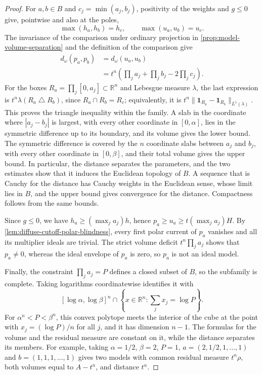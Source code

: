 \begin{proof}
For $a,b\in B$ and $c_j=\min(a_j,b_j)$, positivity of the weights and $g\leq0$ give, pointwise and also at the poles,
\[
 \max(h_a,h_b)=h_c,\qquad \max(u_a,u_b)=u_c.
\]
The invariance of the comparison under ordinary projection in \cref{prop:model-volume-separation} and the definition of the comparison give
\[
 \begin{split}
 d_\omega(p_a,p_b)&=d_\omega(u_a,u_b)\\
 &=t^n\left(\prod_j a_j+\prod_j b_j-2\prod_j c_j\right).
 \end{split}
\]
For the boxes $R_a=\prod_j[0,a_j]\subset\mathbb R^n$ and Lebesgue measure $\lambda$, the last expression is $t^n\lambda(R_a\mathbin{\triangle}R_b)$, since $R_a\cap R_b=R_c$; equivalently, it is $t^n\|\mathbf1_{R_a}-\mathbf1_{R_b}\|_{L^1(\lambda)}$. This proves the triangle inequality within the family. A slab in the coordinate where $|a_j-b_j|$ is largest, with every other coordinate in $[0,\alpha]$, lies in the symmetric difference up to its boundary, and its volume gives the lower bound. The symmetric difference is covered by the $n$ coordinate slabs between $a_j$ and $b_j$, with every other coordinate in $[0,\beta]$, and their total volume gives the upper bound. In particular, the distance separates the parameters, and the two estimates show that it induces the Euclidean topology of $B$. A sequence that is Cauchy for the distance has Cauchy weights in the Euclidean sense, whose limit lies in $B$, and the upper bound gives convergence for the distance. Compactness follows from the same bounds.

Since $g\leq0$, we have $h_a\geq(\max_ja_j)h$, hence $p_a\geq u_a\geq t(\max_ja_j)H$. By \cref{lem:diffuse-cutoff-polar-blindness}, every first polar current of $p_a$ vanishes and all its multiplier ideals are trivial. The strict volume deficit $t^n\prod_j a_j$ shows that $p_a\ne0$, whereas the ideal envelope of $p_a$ is zero, so $p_a$ is not an ideal model.

Finally, the constraint $\prod_ja_j=P$ defines a closed subset of $B$, so the subfamily is complete. Taking logarithms coordinatewise identifies it with
\[
 [\log\alpha,\log\beta]^n
       \cap\left\{x\in\mathbb R^n:\sum_jx_j=\log P\right\}.
\]
For $\alpha^n<P<\beta^n$, this convex polytope meets the interior of the cube at the point with $x_j=(\log P)/n$ for all $j$, and it has dimension $n-1$. The formulas for the volume and the residual measure are constant on it, while the distance separates its members. For example, taking $\alpha=1/2$, $\beta=2$, $P=1$, $a=(2,1/2,1,\ldots,1)$ and $b=(1,1,1,\ldots,1)$ gives two models with common residual measure $t^n\rho$, both volumes equal to $A-t^n$, and distance $t^n$.
\end{proof}
